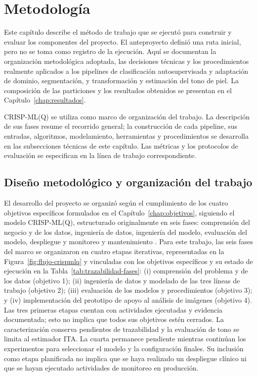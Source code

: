\chapter{Metodología}\label{chap:metodologia}

Este capítulo describe el método de trabajo que se ejecutó para construir y evaluar los componentes del proyecto. El anteproyecto definió una ruta inicial, pero no se toma como registro de la ejecución. Aquí se documentan la organización metodológica adoptada, las decisiones técnicas y los procedimientos realmente aplicados a los pipelines de clasificación autosupervisada y adaptación de dominio, segmentación, y transformación y estimación del tono de piel. La composición de las particiones y los resultados obtenidos se presentan en el Capítulo~\ref{chap:resultados}.

CRISP-ML(Q) se utiliza como marco de organización del trabajo. La descripción de sus fases resume el recorrido general; la construcción de cada pipeline, sus entradas, algoritmos, modelamiento, herramientas y procedimientos se desarrolla en las subsecciones técnicas de este capítulo. Las métricas y los protocolos de evaluación se especifican en la línea de trabajo correspondiente.

\section{Diseño metodológico y organización del trabajo}
\label{sec:fases-investigacion}

El desarrollo del proyecto se organizó según el cumplimiento de los cuatro objetivos específicos formulados en el Capítulo~\ref{chap:objetivos}, siguiendo el modelo CRISP-ML(Q), estructurado originalmente en seis fases: comprensión del negocio y de los datos, ingeniería de datos, ingeniería del modelo, evaluación del modelo, despliegue y monitoreo y mantenimiento \parencite{wirth2000crispdm,studer2021crispmlq}. Para este trabajo, las seis fases del marco se organizaron en cuatro etapas iterativas, representadas en la Figura~\ref{fig:flujo-crispmlq} y vinculadas con los objetivos específicos y su estado de ejecución en la Tabla~\ref{tab:trazabilidad-fases}: (i) comprensión del problema y de los datos (objetivo 1); (ii) ingeniería de datos y modelado de las tres líneas de trabajo (objetivo 2); (iii) evaluación de los modelos y procedimientos (objetivo 3); y (iv) implementación del prototipo de apoyo al análisis de imágenes (objetivo 4). Las tres primeras etapas cuentan con actividades ejecutadas y evidencia documentada; esto no implica que todos sus objetivos estén cerrados. La caracterización conserva pendientes de trazabilidad y la evaluación de tono se limita al estimador ITA. La cuarta permanece pendiente mientras continúan los experimentos para seleccionar el modelo y la configuración finales. Su inclusión como etapa planificada no implica que se haya realizado un despliegue clínico ni que se hayan ejecutado actividades de monitoreo en producción.

